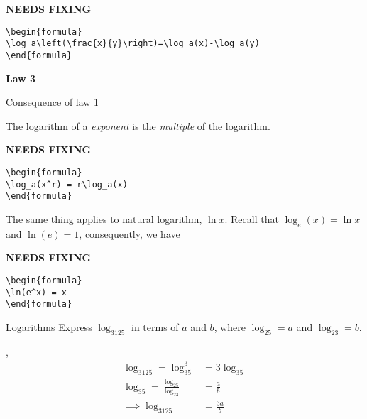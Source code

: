 {\hfill\Large\bfseries NEEDS FIXING\hfill}
\begin{lstlisting}
\begin{formula}
\log_a\left(\frac{x}{y}\right)=\log_a(x)-\log_a(y)
\end{formula}
 \end{lstlisting}


\vspace{5mm}
\par \textbf{Law 3}
\par Consequence of law 1
\par The logarithm of a \textit{exponent} is the \textit {multiple} of the logarithm.

{\hfill\Large\bfseries NEEDS FIXING\hfill}
\begin{lstlisting}
\begin{formula}
\log_a(x^r) = r\log_a(x)
\end{formula}
 \end{lstlisting}

\vspace{5mm}
The same thing applies to natural logarithm, $\ln x$.
Recall that $\log_e(x)=\ln x$ and $\ln(e)=1$, consequently, we have

{\hfill\Large\bfseries NEEDS FIXING\hfill}
\begin{lstlisting}
\begin{formula}
\ln(e^x) = x
\end{formula}
 \end{lstlisting}

\begin{example}{Logarithms}
Express \(\log_3125\) in terms of \(a\) and \(b\), where \(\log_25=a\) and \(\log_23=b\).

\sep
\begin{align}
    \log_3125=\log_35^{3}&=3\log_35\\
    \log_35=\frac{\log_25}{\log_23}&=\frac{a}{b}\\
    \implies \log_3125&=\frac{3a}{b}
\end{align}
\end{example}
